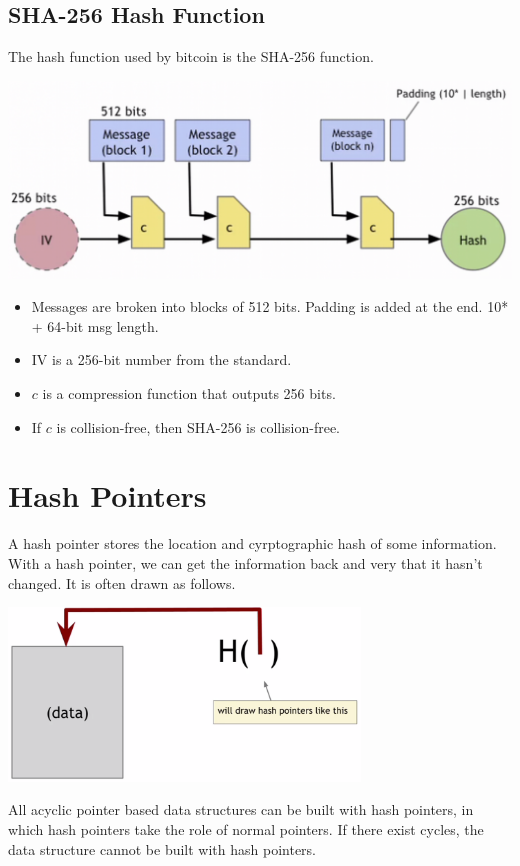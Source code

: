 \subsection{SHA-256 Hash Function}
The hash function used by bitcoin is the SHA-256 function.
\begin{center}
  \includegraphics[width=\textwidth]{sha256.png}
\end{center}
\begin{itemize}
  \item Messages are broken into blocks of 512 bits. Padding is added at the end. 10* + 64-bit msg length.
  \item IV is a 256-bit number from the standard.
  \item $c$ is a compression function that outputs 256 bits.
  \item If $c$ is collision-free, then SHA-256 is collision-free.
\end{itemize}
\section{Hash Pointers}
A hash pointer stores the location and cyrptographic hash of some information. With a hash pointer, we can get the information back and very that it hasn't changed. It is often drawn as follows.
\begin{center}
  \includegraphics[width=0.7\textwidth]{hashpointer.png}
\end{center}
All acyclic pointer based data structures can be built with hash pointers, in which hash pointers take the role of normal pointers. If there exist cycles, the data structure cannot be built with hash pointers.
